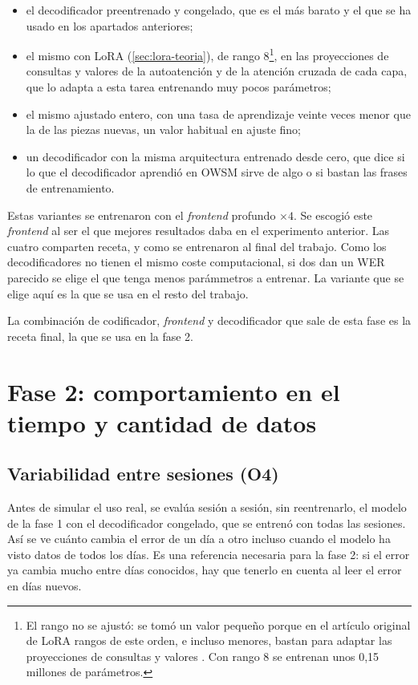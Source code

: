 \begin{itemize}[leftmargin=*, itemsep=0.3em]
  \item el decodificador preentrenado y congelado, que es el más barato y el que se ha usado en los apartados anteriores;
  \item el mismo con LoRA (\cref{sec:lora-teoria}), de rango 8\footnote{El rango no se ajustó: se tomó un valor pequeño porque en el artículo original de LoRA rangos de este orden, e incluso menores, bastan para adaptar las proyecciones de consultas y valores \cite{hu2022lora}. Con rango 8 se entrenan unos 0,15 millones de parámetros.}, en las proyecciones de consultas y valores de la autoatención y de la atención cruzada de cada capa, que lo adapta a esta tarea entrenando muy pocos parámetros;
  \item el mismo ajustado entero, con una tasa de aprendizaje veinte veces menor que la de las piezas nuevas, un valor habitual en ajuste fino;
  \item un decodificador con la misma arquitectura entrenado desde cero, que dice si lo que el decodificador aprendió en OWSM sirve de algo o si bastan las frases de entrenamiento.
\end{itemize}

Estas variantes se entrenaron con el \textit{frontend} profundo $\times 4$. Se escogió este \textit{frontend} al ser el que mejores resultados daba en el experimento anterior. Las cuatro comparten receta, y como se entrenaron al final del trabajo. Como los decodificadores no tienen el mismo coste computacional, si dos dan un WER parecido se elige el que tenga menos parámmetros a entrenar. La variante que se elige aquí es la que se usa en el resto del trabajo.

La combinación de codificador, \textit{frontend} y decodificador que sale de esta fase es la receta final, la que se usa en la fase 2.

\section{Fase 2: comportamiento en el tiempo y cantidad de datos}
\label{sec:fase2}

\subsection{Variabilidad entre sesiones (O4)}

Antes de simular el uso real, se evalúa sesión a sesión, sin reentrenarlo, el modelo de la fase 1 con el decodificador congelado, que se entrenó con todas las sesiones. Así se ve cuánto cambia el error de un día a otro incluso cuando el modelo ha visto datos de todos los días. Es una referencia necesaria para la fase 2: si el error ya cambia mucho entre días conocidos, hay que tenerlo en cuenta al leer el error en días nuevos.

